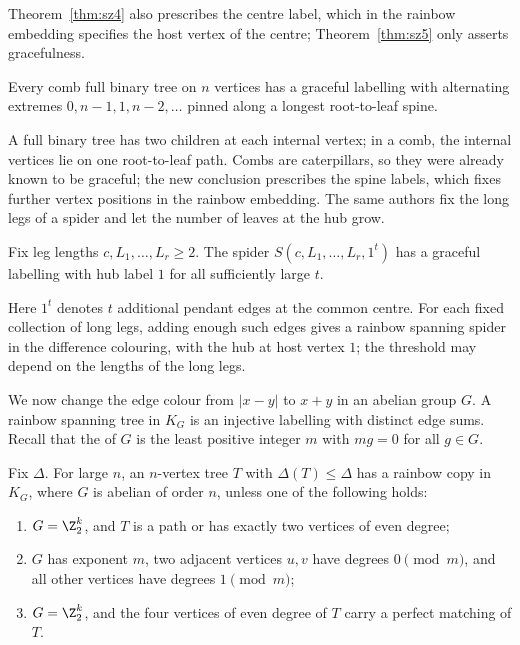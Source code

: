 Theorem~\ref{thm:sz4} also prescribes the centre label, which in the rainbow embedding specifies the host vertex of the centre; Theorem~\ref{thm:sz5} only asserts gracefulness.

\begin{theorem}\label{thm:dn-comb}
Every comb full binary tree on $n$ vertices has a graceful labelling with alternating extremes $0,n-1,1,n-2,\dots$ pinned along a longest root-to-leaf spine.
\end{theorem}

A full binary tree has two children at each internal vertex; in a comb, the internal vertices lie on one root-to-leaf path. Combs are caterpillars, so they were already known to be graceful; the new conclusion prescribes the spine labels, which fixes further vertex positions in the rainbow embedding. The same authors fix the long legs of a spider and let the number of leaves at the hub grow.

\begin{theorem}\label{thm:dn-spider}
Fix leg lengths $c,L_1,\dots,L_r\geq2$. The spider $S(c,L_1,\dots,L_r,1^t)$ has a graceful labelling with hub label $1$ for all sufficiently large $t$.
\end{theorem}

Here $1^t$ denotes $t$ additional pendant edges at the common centre. For each fixed collection of long legs, adding enough such edges gives a rainbow spanning spider in the difference colouring, with the hub at host vertex $1$; the threshold may depend on the lengths of the long legs.


We now change the edge colour from $|x-y|$ to $x+y$ in an abelian group $G$. A rainbow spanning tree in $K_G$ is an injective labelling with distinct edge sums. Recall that the  of $G$ is the least positive integer $m$ with $mg=0$ for all $g\in G$.

\begin{theorem}\label{thm:mp-sum}
Fix $\Delta$. For large $n$, an $n$-vertex tree $T$ with $\Delta(T)\leq\Delta$ has a rainbow copy in $K_G$, where $G$ is abelian of order $n$, unless one of the following holds:
\begin{enumerate}
\item $G=\Z_2^k$, and $T$ is a path or has exactly two vertices of even degree;
\item $G$ has exponent $m$, two adjacent vertices $u,v$ have degrees $0\pmod m$, and all other vertices have degrees $1\pmod m$;
\item $G=\Z_2^k$, and the four vertices of even degree of $T$ carry a perfect matching of $T$.
\end{enumerate}
\end{theorem}

